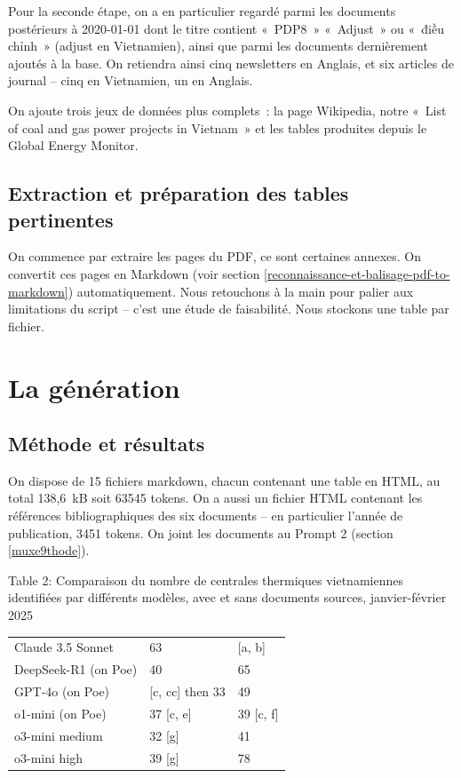 \documentclass[a4paper,11pt]{report}
\begin{document}
Pour la seconde étape, on a en particulier regardé parmi les documents postérieurs à 2020-01-01 dont le titre contient «~PDP8~» «~Adjust~» ou «~điều chỉnh~» (adjust en Vietnamien), ainsi que parmi les documents dernièrement ajoutés à la base. On retiendra ainsi cinq newsletters en Anglais, et six articles de journal -- cinq en Vietnamien, un en Anglais.

On ajoute trois jeux de données plus complets~: la page Wikipedia, notre «~List of coal and gas power projects in Vietnam~» et les tables produites depuis le Global Energy Monitor.

\subsection{Extraction et préparation des tables pertinentes}\label{extraction-et-pruxe9paration-des-tables-pertinentes}

On commence par extraire les pages du PDF, ce sont certaines annexes. On convertit ces pages en Markdown (voir section \ref{reconnaissance-et-balisage-pdf-to-markdown}) automatiquement. Nous retouchons à la main pour palier aux limitations du script -- c'est une étude de faisabilité. Nous stockons une table par fichier.

\section{La génération}\label{la-guxe9nuxe9ration}

\subsection{Méthode et résultats}\label{muxe9thode-et-ruxe9sultats}

On dispose de 15 fichiers markdown, chacun contenant une table en HTML, au total 138,6~kB soit 63545 tokens. On a aussi un fichier HTML contenant les références bibliographiques des six documents -- en particulier l'année de publication, 3451 tokens. On joint les documents au Prompt 2 (section \ref{muxe9thode}).

Table 2: Comparaison du nombre de centrales thermiques vietnamiennes identifiées par différents modèles, avec et sans documents sources, janvier-février 2025

\begin{longtable}[]{@{}lll@{}}
\toprule\noalign{}
& & \\
\midrule\noalign{}
\endhead
\bottomrule\noalign{}
\endlastfoot
Claude 3.5 Sonnet & 63 & {[}a, b{]} \\
DeepSeek-R1 (on Poe) & 40 & 65 \\
GPT-4o (on Poe) & {[}c, cc{]} then 33 & 49 \\
o1-mini (on Poe) & 37 {[}c, e{]} & 39 {[}c, f{]} \\
o3-mini medium & 32 {[}g{]} & 41 \\
o3-mini high & 39 {[}g{]} & 78 \\
\end{longtable}
\end{document}
